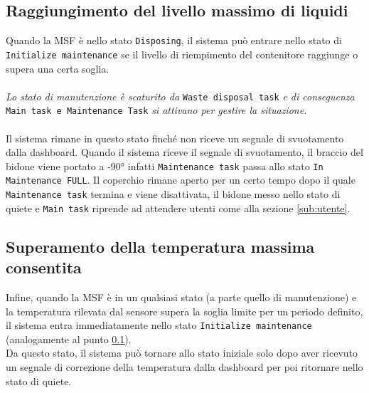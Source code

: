 \documentclass{report}
\begin{document}
\subsection{Raggiungimento del livello massimo di liquidi}
\label{sub:liquids}
\par {
Quando la MSF è nello stato \texttt{Disposing}, il sistema può entrare nello stato di \texttt{Initialize maintenance} se il livello di riempimento del contenitore raggiunge o supera una certa soglia. 
\\
\\
\textit{Lo stato di manutenzione è scaturito da } \texttt{Waste disposal task} \textit{ e di conseguenza }\texttt{ Main task e Maintenance Task} \textit{ si attivano per gestire la situazione.}
\\
\\
Il sistema rimane in questo stato finché non riceve un segnale di svuotamento dalla dashboard. Quando il sistema riceve il segnale di svuotamento, il braccio del bidone viene portato a -90° infatti \texttt{Maintenance task} passa allo stato \texttt{In Maintenance FULL}. Il coperchio rimane aperto per un certo tempo dopo il quale \texttt{Maintenance task} termina e viene disattivata, il bidone messo nello stato di quiete e \texttt{Main task} riprende ad attendere utenti come alla sezione \ref{sub:utente}. 
}
\subsection{Superamento della temperatura massima consentita}
\par {
Infine, quando la MSF è in un qualsiasi stato (a parte quello di manutenzione) e la temperatura rilevata dal sensore supera la soglia limite per un periodo definito, il sistema entra immediatamente nello stato \texttt{Initialize maintenance} (analogamente al punto \ref{sub:liquids}).\\
Da questo stato, il sistema può tornare allo stato iniziale solo dopo aver ricevuto un segnale di correzione della temperatura dalla dashboard per poi ritornare nello stato di quiete.
}
\end{document}
